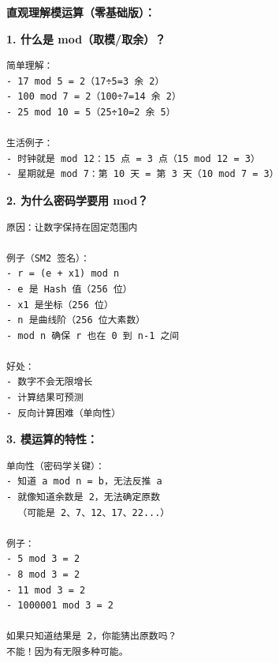\begin{theorybox}
\textbf{直观理解模运算（零基础版）：}

\textbf{1. 什么是 mod（取模/取余）？}

\begin{lstlisting}
简单理解：
- 17 mod 5 = 2（17÷5=3 余 2）
- 100 mod 7 = 2（100÷7=14 余 2）
- 25 mod 10 = 5（25÷10=2 余 5）

生活例子：
- 时钟就是 mod 12：15 点 = 3 点（15 mod 12 = 3）
- 星期就是 mod 7：第 10 天 = 第 3 天（10 mod 7 = 3）
\end{lstlisting}

\textbf{2. 为什么密码学要用 mod？}

\begin{lstlisting}
原因：让数字保持在固定范围内

例子（SM2 签名）：
- r = (e + x1) mod n
- e 是 Hash 值（256 位）
- x1 是坐标（256 位）
- n 是曲线阶（256 位大素数）
- mod n 确保 r 也在 0 到 n-1 之间

好处：
- 数字不会无限增长
- 计算结果可预测
- 反向计算困难（单向性）
\end{lstlisting}

\textbf{3. 模运算的特性：}

\begin{lstlisting}
单向性（密码学关键）：
- 知道 a mod n = b，无法反推 a
- 就像知道余数是 2，无法确定原数
  （可能是 2、7、12、17、22...）

例子：
- 5 mod 3 = 2
- 8 mod 3 = 2
- 11 mod 3 = 2
- 1000001 mod 3 = 2

如果只知道结果是 2，你能猜出原数吗？
不能！因为有无限多种可能。
\end{lstlisting}
\end{theorybox}
